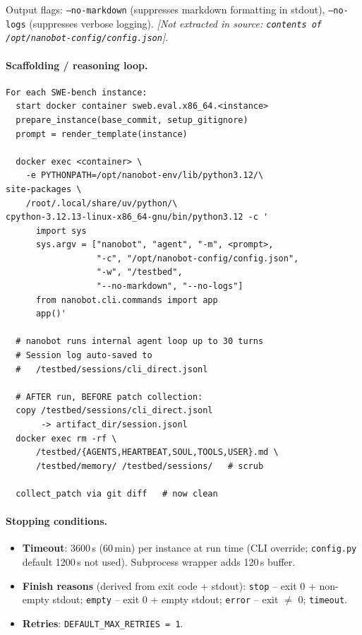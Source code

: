 Output flags: \texttt{--no-markdown} (suppresses markdown formatting in stdout), \texttt{--no-logs} (suppresses verbose logging). \textit{[Not extracted in source: \texttt{contents of /opt/nanobot-config/config.json}]}.

\paragraph{Scaffolding / reasoning loop.}
\begin{verbatim}
For each SWE-bench instance:
  start docker container sweb.eval.x86_64.<instance>
  prepare_instance(base_commit, setup_gitignore)
  prompt = render_template(instance)

  docker exec <container> \
    -e PYTHONPATH=/opt/nanobot-env/lib/python3.12/\
site-packages \
    /root/.local/share/uv/python/\
cpython-3.12.13-linux-x86_64-gnu/bin/python3.12 -c '
      import sys
      sys.argv = ["nanobot", "agent", "-m", <prompt>,
                  "-c", "/opt/nanobot-config/config.json",
                  "-w", "/testbed",
                  "--no-markdown", "--no-logs"]
      from nanobot.cli.commands import app
      app()'

  # nanobot runs internal agent loop up to 30 turns
  # Session log auto-saved to
  #   /testbed/sessions/cli_direct.jsonl

  # AFTER run, BEFORE patch collection:
  copy /testbed/sessions/cli_direct.jsonl
       -> artifact_dir/session.jsonl
  docker exec rm -rf \
      /testbed/{AGENTS,HEARTBEAT,SOUL,TOOLS,USER}.md \
      /testbed/memory/ /testbed/sessions/   # scrub

  collect_patch via git diff   # now clean
\end{verbatim}

\paragraph{Stopping conditions.}
\begin{itemize}
  \item \textbf{Timeout}: 3600\,s (60\,min) per instance at run time (CLI override; \texttt{config.py} default 1200\,s not used). Subprocess wrapper adds 120\,s buffer.
  \item \textbf{Finish reasons} (derived from exit code + stdout): \texttt{stop} -- exit 0 + non-empty stdout; \texttt{empty} -- exit 0 + empty stdout; \texttt{error} -- exit $\neq$ 0; \texttt{timeout}.
  \item \textbf{Retries}: \texttt{DEFAULT\_MAX\_RETRIES = 1}.
\end{itemize}

